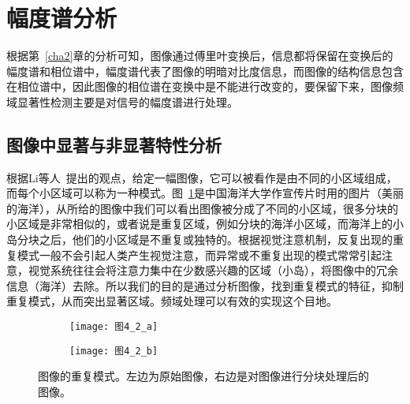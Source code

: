 \section{幅度谱分析}
\label{4_1}

根据第~\ref{cha2}章的分析可知，图像通过傅里叶变换后，信息都将保留在变换后的幅度谱和相位谱中，幅度谱代表了图像的明暗对比度信息，而图像的结构信息包含在相位谱中，因此图像的相位谱在变换中是不能进行改变的，要保留下来，图像频域显著性检测主要是对信号的幅度谱进行处理。

\subsection{图像中显著与非显著特性分析}
\label{4_1_1}

根据Li等人~\cite{LiJianTPAMI2013Scale}提出的观点，给定一幅图像，它可以被看作是由不同的小区域组成，而每个小区域可以称为一种模式。图~\ref{图4_2}是中国海洋大学作宣传片时用的图片（美丽的海洋），从所给的图像中我们可以看出图像被分成了不同的小区域，很多分块的小区域是非常相似的，或者说是重复区域，例如分块的海洋小区域，而海洋上的小岛分块之后，他们的小区域是不重复或独特的。根据视觉注意机制，反复出现的重复模式一般不会引起人类产生视觉注意，而异常或不重复出现的模式常常引起注意，视觉系统往往会将注意力集中在少数感兴趣的区域（小岛），将图像中的冗余信息（海洋）去除。所以我们的目的是通过分析图像，找到重复模式的特征，抑制重复模式，从而突出显著区域。频域处理可以有效的实现这个目地。
\begin{figure}[h]
  \centering%
  \begin{subfigure}{0.38\textwidth}
    \texttt{[image: 图4\_2\_a]}
  \end{subfigure}
  \hspace{4em}%
  \begin{subfigure}{0.45\textwidth}
    \texttt{[image: 图4\_2\_b]}
  \end{subfigure}
  \caption{图像的重复模式。左边为原始图像，右边是对图像进行分块处理后的图像。}
  \label{图4_2}
\end{figure}

